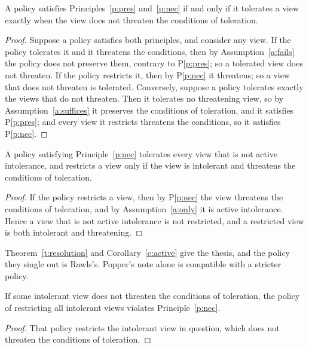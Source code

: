 \documentclass{situationist-preprint}
\begin{document}
\begin{theorem}[Resolution]\label{t:resolution}
A policy satisfies Principles~\ref{p:pres} and~\ref{p:nec} if and only if it tolerates a view exactly when the view does not threaten the conditions of toleration.
\end{theorem}

\begin{proof}
Suppose a policy satisfies both principles, and consider any view. If the policy tolerates it and it threatens the conditions, then by Assumption~\ref{a:fails} the policy does not preserve them, contrary to P\ref{p:pres}; so a tolerated view does not threaten. If the policy restricts it, then by P\ref{p:nec} it threatens; so a view that does not threaten is tolerated. Conversely, suppose a policy tolerates exactly the views that do not threaten. Then it tolerates no threatening view, so by Assumption~\ref{a:suffices} it preserves the conditions of toleration, and it satisfies P\ref{p:pres}; and every view it restricts threatens the conditions, so it satisfies P\ref{p:nec}.
\end{proof}

\begin{corollary}\label{c:active}
A policy satisfying Principle~\ref{p:nec} tolerates every view that is not active intolerance, and restricts a view only if the view is intolerant and threatens the conditions of toleration.
\end{corollary}

\begin{proof}
If the policy restricts a view, then by P\ref{p:nec} the view threatens the conditions of toleration, and by Assumption~\ref{a:only} it is active intolerance. Hence a view that is not active intolerance is not restricted, and a restricted view is both intolerant and threatening.
\end{proof}

Theorem~\ref{t:resolution} and Corollary~\ref{c:active} give the thesis, and the policy they single out is Rawls's. Popper's note alone is compatible with a stricter policy.

\begin{proposition}\label{p:strict}
If some intolerant view does not threaten the conditions of toleration, the policy of restricting all intolerant views violates Principle~\ref{p:nec}.
\end{proposition}

\begin{proof}
That policy restricts the intolerant view in question, which does not threaten the conditions of toleration.
\end{proof}
\end{document}
